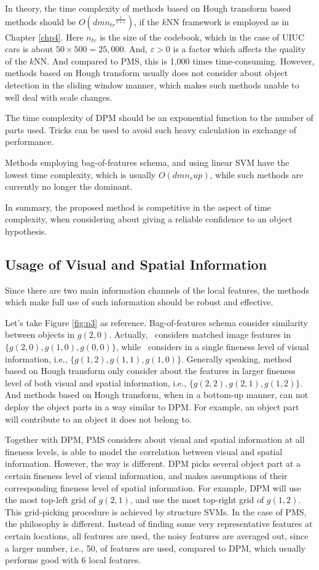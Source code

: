 In theory, the time complexity of methods based on Hough transform based methods should be $O(dm{n_{tr}}^{\frac 1 {1+\varepsilon}})$, if the $k$NN framework is employed as in Chapter \ref{chp4}. Here $n_{tr}$ is the size of the codebook, which in the case of UIUC cars is about $50\times 500=25,000$. And, $\varepsilon > 0$ is a factor which affects the quality of the $k$NN. And compared to PMS, this is 1,000 times time-consuming. However, methods based on Hough transform usually does not consider about object detection in the sliding window manner, which makes such methods unable to well deal with scale changes.

The time complexity of DPM should be an exponential function to the number of parts used. Tricks can be used to avoid such heavy calculation in exchange of performance.

Methods employing bag-of-features schema, and using linear SVM have the lowest time complexity, which is usually  $O(dmn_sup)$, while such methods are currently no longer the dominant.

In summary, the proposed method is competitive in the aspect of time complexity, when considering about giving a reliable confidence to an object hypothesis.

\subsection{Usage of Visual and Spatial Information}
Since there are two main information channels of the local features, the methods which make full use of such information should be robust and effective.

Let's take Figure \ref{fig:p3} as reference. Bag-of-features schema consider similarity between objects in $g(2,0)$. Actually,~\citep{pmk} considers matched image features in $\{g(2,0),g(1,0),g(0,0)\}$, while~\citep{spmk} considers in a single fineness level of visual information, i.e., $\{g(1,2),g(1,1),g(1,0)\}$. Generally speaking, method based on Hough transform only consider about the features in larger fineness level of both visual and spatial information, i.e., $\{g(2,2),g(2,1),g(1,2)\}$. And methods based on Hough transform, when in a bottom-up manner, can not deploy the object parts in a way similar to DPM. For example, an object part will contribute to an object it does not belong to.

Together with DPM, PMS considers about visual and spatial information at all fineness levels, is able to model the correlation between visual and spatial information. However, the way is different. DPM picks several object part at a certain fineness level of visual information, and makes assumptions of their corresponding fineness level of spatial information. For example, DPM will use the most top-left grid of $g(2,1)$, and use the most top-right grid of $g(1,2)$. This grid-picking procedure is achieved by structure SVMs. In the case of PMS, the philosophy is different. Instead of finding some very representative features at certain locations, all features are used, the noisy features are averaged out, since a larger number, i.e., 50, of features are used, compared to DPM, which usually performs good with 6 local features.


